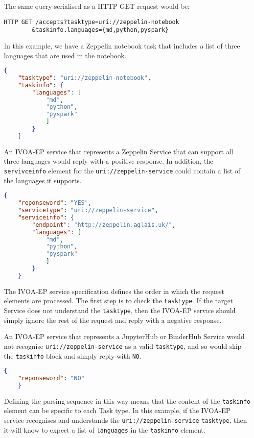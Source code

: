 \documentclass[11pt,a4paper]{ivoa}
\newcommand{\ivoep} {IVOA-EP\xspace}
\newcommand{\binderhub} {BinderHub\xspace}
\newcommand{\jupyterhub} {JupyterHub\xspace}
\newcommand{\zeppelin} {Zeppelin\xspace}
\newcommand{\codeword}[1] {\texttt{#1}}
\begin{document}
The same query serialised as a HTTP GET request would be:
\begin{lstlisting}[]
    HTTP GET /accepts?tasktype=uri://zeppelin-notebook
        &taskinfo.languages={md,python,pyspark}
\end{lstlisting}

In this example, we have a \zeppelin notebook task that includes a list of three languages that are used in the notebook.
\begin{lstlisting}[language=json]
    {
    "tasktype": "uri://zeppelin-notebook",
    "taskinfo": {
        "languages": [
            "md",
            "python",
            "pyspark"
            ]
        }
    }
\end{lstlisting}

An \ivoep service that represents a \zeppelin Service that can support all three languages would reply with a positive response. In addition, the \codeword{servivceinfo} element for the \codeword{uri://zeppelin-service} could contain a list of the languages it supports.
\begin{lstlisting}[language=json]
    {
    "reponseword": "YES",
    "servicetype": "uri://zeppelin-service",
    "serviceinfo": {
        "endpoint": "http://zeppelin.aglais.uk/",
        "languages": [
            "md",
            "python",
            "pyspark"
            ]
        }
    }
\end{lstlisting}

The \ivoep service specification defines the order in which the request elements are processed.
The first step is to check the \codeword{tasktype}. If the target Service does not understand the \codeword{tasktype}, then the \ivoep service should simply ignore the rest of the request and reply with a negative response.

An \ivoep service that represents a \jupyterhub or \binderhub Service would not recognise \codeword{uri://zeppelin-service} as a valid \codeword{tasktype}, and so would skip the \codeword{taskinfo} block and simply reply with \codeword{NO}.
\begin{lstlisting}[language=json]
    {
    "reponseword": "NO"
    }
\end{lstlisting}

Defining the parsing sequence in this way means that the content of the \codeword{taskinfo} element can be specific to each Task type.
In this example, if the \ivoep service recognises and understands the \codeword{uri://zeppelin-service} \codeword{tasktype}, then it will know to expect a list of \codeword{languages} in the \codeword{taskinfo} element.
\end{document}
